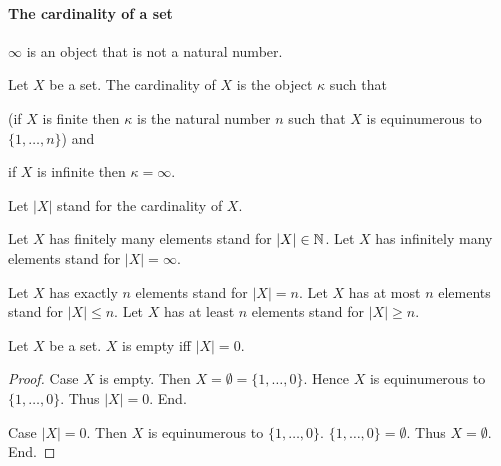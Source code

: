 \documentclass[../arithmetic.tex]{subfiles}
\begin{document}
  \paragraph{The cardinality of a set}

  \begin{forthel}
    \begin{signature}
      $\infty$ is an object that is not a natural number.
    \end{signature}
  \end{forthel}

  \begin{forthel}
    \begin{definition}
      Let $X$ be a set.
      The cardinality of $X$ is the object $\kappa$ such that

      (if $X$ is finite then $\kappa$ is the natural number $n$ such that $X$ is
      equinumerous to $\{ 1, \dots, n \}$) and

      if $X$ is infinite then $\kappa = \infty$.
    \end{definition}

    Let $|X|$ stand for the cardinality of $X$.

    Let $X$ has finitely many elements stand for $|X| \in \mathbb{N}$.
    Let $X$ has infinitely many elements stand for $|X| = \infty$.

    Let $X$ has exactly $n$ elements stand for $|X| = n$.
    Let $X$ has at most $n$ elements stand for $|X| \leq n$.
    Let $X$ has at least $n$ elements stand for $|X| \geq n$.
  \end{forthel}

  \begin{forthel}
    \begin{proposition}
      Let $X$ be a set.
      $X$ is empty iff $|X| = 0$.
    \end{proposition}
    \begin{proof}
      Case $X$ is empty.
        Then $X = \emptyset = \{ 1, \dots, 0 \}$.
        Hence $X$ is equinumerous to $\{ 1, \dots, 0 \}$.
        Thus $|X| = 0$.
      End.

      Case $|X| = 0$.
        Then $X$ is equinumerous to $\{ 1, \dots, 0 \}$.
        $\{ 1, \dots, 0 \} = \emptyset$.
        Thus $X = \emptyset$.
      End.
    \end{proof}
  \end{forthel}
\end{document}

